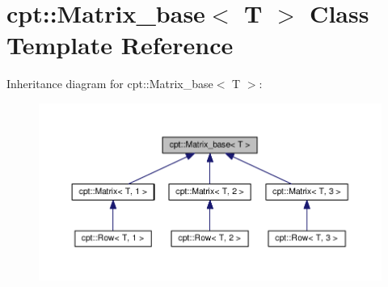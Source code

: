 \hypertarget{classcpt_1_1Matrix__base}{}\section{cpt\+:\+:Matrix\+\_\+base$<$ T $>$ Class Template Reference}
\label{classcpt_1_1Matrix__base}


Inheritance diagram for cpt\+:\+:Matrix\+\_\+base$<$ T $>$\+:
\nopagebreak
\begin{figure}[H]
\begin{center}
\leavevmode
\includegraphics[width=350pt]{classcpt_1_1Matrix__base__inherit__graph}
\end{center}
\end{figure}
